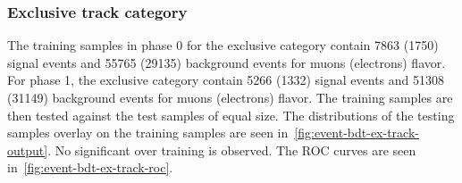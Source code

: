 \clearpage
\subsubsection{Exclusive track category}

The training samples in phase 0 for the exclusive  category contain 7863 (1750) signal events and 55765 (29135) background events for muons (electrons) flavor. For phase 1,  the exclusive  category contain 5266 (1332) signal events and 51308 (31149) background events for muons (electrons) flavor. The training samples are then tested against the test samples of equal size. The distributions of the testing samples overlay on the training samples are seen in~\ref{fig:event-bdt-ex-track-output}. No significant over training is observed. The ROC curves are seen in~\ref{fig:event-bdt-ex-track-roc}.

